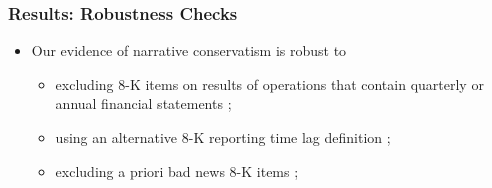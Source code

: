 \documentclass{beamer}
\begin{document}
\begin{frame}
	\frametitle{Results: Robustness Checks}
\begin{itemize}
	\item Our evidence of narrative conservatism is robust to 
	\begin{itemize}
		\item excluding 8-K items on results of operations that contain quarterly or annual financial statements \citep{segalAreManagersStrategic2016};
		\item using an alternative 8-K reporting time lag definition \citep{carterRelevanceForm8K1999, niessnerStrategicDisclosureTiming2015, chapmanInformationOverloadDisclosure2019};
		\item excluding a priori bad news 8-K items \citep{segalAreManagersStrategic2016};
	\end{itemize}
\end{itemize}
\end{frame}
\end{document}
